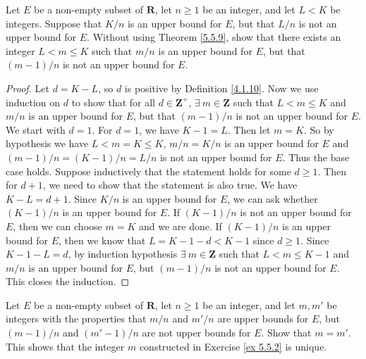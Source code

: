 \begin{exercise}\label{ex 5.5.2}
    Let \(E\) be a non-empty subset of \(\mathbf{R}\), let \(n \geq 1\) be an integer, and let \(L < K\) be integers.
    Suppose that \(K / n\) is an upper bound for \(E\), but that \(L / n\) is not an upper bound for \(E\).
    Without using Theorem \ref{5.5.9}, show that there exists an integer \(L < m \leq K\) such that \(m / n\) is an upper bound for \(E\), but that \((m - 1) / n\) is not an upper bound for \(E\).
\end{exercise}

\begin{proof}
    Let \(d = K - L\), so \(d\) is positive by Definition \ref{4.1.10}.
    Now we use induction on \(d\) to show that for all \(d \in \mathbf{Z}^+\), \(\exists\ m \in \mathbf{Z}\) such that \(L < m \leq K\) and \(m / n\) is an upper bound for \(E\), but that \((m - 1) / n\) is not an upper bound for \(E\).
    We start with \(d = 1\).
    For \(d = 1\), we have \(K - 1 = L\).
    Then let \(m = K\).
    So by hypothesis we have \(L < m = K \leq K\), \(m / n = K / n\) is an upper bound for \(E\) and \((m - 1) / n = (K - 1) / n = L / n\) is not an upper bound for \(E\).
    Thus the base case holds.
    Suppose inductively that the statement holds for some \(d \geq 1\).
    Then for \(d + 1\), we need to show that the statement is also true.
    We have \(K - L = d + 1\).
    Since \(K / n\) is an upper bound for \(E\), we can ask whether \((K - 1) / n\) is an upper bound for \(E\).
    If \((K - 1) / n\) is not an upper bound for \(E\), then we can choose \(m = K\) and we are done.
    If \((K - 1) / n\) is an upper bound for \(E\), then we know that \(L = K - 1 - d < K - 1\) since \(d \geq 1\).
    Since \(K - 1 - L = d\), by induction hypothesis \(\exists\ m \in \mathbf{Z}\) such that \(L < m \leq K - 1\) and \(m / n\) is an upper bound for \(E\), but \((m - 1) / n\) is not an upper bound for \(E\).
    This closes the induction.
\end{proof}

\begin{exercise}\label{ex 5.5.3}
    Let \(E\) be a non-empty subset of \(\mathbf{R}\), let \(n \geq 1\) be an integer, and let \(m, m'\) be integers with the properties that \(m / n\) and \(m' / n\) are upper bounds for \(E\), but \((m - 1) / n\) and \((m' - 1) / n\) are not upper bounds for \(E\).
    Show that \(m = m'\).
    This shows that the integer \(m\) constructed in Exercise \ref{ex 5.5.2} is unique.
\end{exercise}

